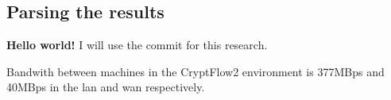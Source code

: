 \documentclass[../thesis.tex]{subfiles}
\begin{document}
\subsection{Parsing the results}

\textbf{Hello world!}
I will use the commit  for this research.

Bandwith between machines in the CryptFlow2 environment is 377MBps and 40MBps in the lan and wan respectively. 
\end{document}
